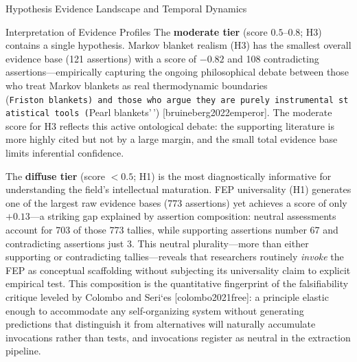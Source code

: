 \documentclass[
  ignorenonframetext,
]{beamer}
\providecommand{\citep}[1]{[#1]}
\begin{document}
\begin{frame}{Hypothesis Evidence Landscape
and Temporal Dynamics \label{sec:hypothesis_results}}
\begin{block}{Interpretation of Evidence Profiles}
The \textbf{moderate tier} (score \(0.5\)--\(0.8\); H3) contains a
single hypothesis. Markov blanket realism (H3) has the smallest overall
evidence base (121 assertions) with a score of \(-0.82\) and 108
contradicting assertions---empirically capturing the ongoing
philosophical debate between those who treat Markov blankets as real
thermodynamic boundaries
(\texttt{Friston\ blankets\textquotesingle{}\textquotesingle{})\ and\ those\ who\ argue\ they\ are\ purely\ instrumental\ statistical\ tools\ (}Pearl
blankets'\,') \citep{bruineberg2022emperor}. The moderate score for H3
reflects this active ontological debate: the supporting literature is
more highly cited but not by a large margin, and the small total
evidence base limits inferential confidence.

The \textbf{diffuse tier} (score \(< 0.5\); H1) is the most
diagnostically informative for understanding the field's intellectual
maturation. FEP universality (H1) generates one of the largest raw
evidence bases (773 assertions) yet achieves a score of only
\(+0.13\)---a striking gap explained by assertion composition: neutral
assessments account for 703 of those 773 tallies, while supporting
assertions number 67 and contradicting assertions just 3. This neutral
plurality---more than either supporting or contradicting
tallies---reveals that researchers routinely \textit{invoke} the FEP as
conceptual scaffolding without subjecting its universality claim to
explicit empirical test. This composition is the quantitative
fingerprint of the falsifiability critique leveled by Colombo and
Seri`es \citep{colombo2021free}: a principle elastic enough to
accommodate any self-organizing system without generating predictions
that distinguish it from alternatives will naturally accumulate
invocations rather than tests, and invocations register as neutral in
the extraction pipeline.
\end{block}


\end{frame}
\end{document}
